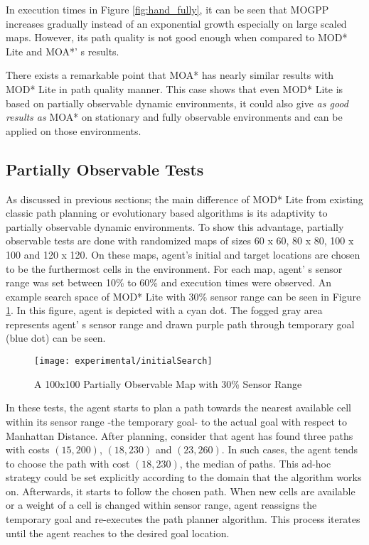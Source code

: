 In execution times in Figure \ref{fig:hand_fully}, it can be seen that MOGPP increases gradually instead of an exponential growth especially on large scaled maps. However, its path quality is not good enough when compared to MOD* Lite and MOA*' s results.

There exists a remarkable point that MOA* has nearly similar results with MOD* Lite in path quality manner. This case shows that even MOD* Lite is based on partially observable dynamic environments, it could also give \textit{as good results as} MOA* on stationary and fully observable environments and can be applied on those environments.

\subsection{Partially Observable Tests}

As discussed in previous sections; the main difference of MOD* Lite from existing classic path planning or evolutionary based algorithms is its adaptivity to partially observable dynamic environments. To show this advantage, partially observable tests are done with randomized maps of sizes 60 x 60, 80 x 80, 100 x 100 and 120 x 120. On these maps, agent's initial and target locations are chosen to be the furthermost cells in the environment. For each map, agent' s sensor range was set between 10\% to 60\% and execution times were observed. An example search space of MOD* Lite with 30\% sensor range can be seen in Figure \ref{fig:initialSearch}. In this figure, agent is depicted with a cyan dot. The fogged gray area represents agent' s sensor range and drawn purple path through temporary goal (blue dot) can be seen.

\begin{figure}
\centering
\texttt{[image: experimental/initialSearch]}
\caption{A 100x100 Partially Observable Map with 30\% Sensor Range}
\label{fig:initialSearch}
\end{figure}

In these tests, the agent starts to plan a path towards the nearest available cell within its sensor range -the temporary goal- to the actual goal with respect to Manhattan Distance. After planning, consider that agent has found three paths with costs $(15, 200)$, $(18, 230)$ and $(23, 260)$. In such cases, the agent tends to choose the path with cost $(18, 230)$, the median of paths. This ad-hoc strategy could be set explicitly according to the domain that the algorithm works on. Afterwards, it starts to follow the chosen path. When new cells are available or a weight of a cell is changed within sensor range, agent reassigns the temporary goal and re-executes the path planner algorithm. This process iterates until the agent reaches to the desired goal location.

